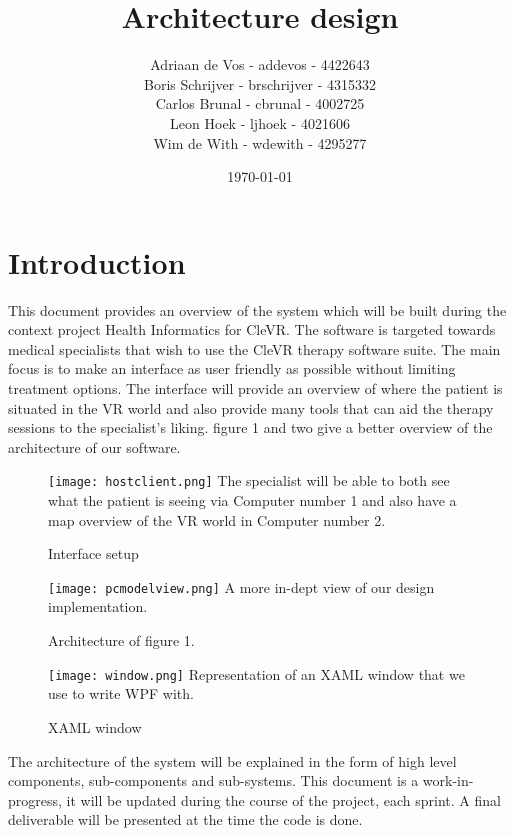 \documentclass[11pt]{article}
\begin{document}
\title{Architecture design}
\author{
	Adriaan de Vos - addevos - 4422643\\
	Boris Schrijver - brschrijver - 4315332\\
	Carlos Brunal - cbrunal - 4002725\\
	Leon Hoek - ljhoek - 4021606\\
	Wim de With - wdewith - 4295277
}

\date{\today}
\maketitle
\newpage
\tableofcontents
\newpage

\section{Introduction}
This document provides an overview of the system which will be built during the context project Health Informatics for \gls{CleVR}.
\newline
The software is targeted towards medical specialists that wish to use the CleVR therapy software suite. The main focus is to make an interface as user friendly as possible without limiting treatment options. The interface will provide an overview of where the patient is situated in the VR world and also provide many tools that can aid the therapy sessions to the specialist's liking. figure 1 and two give a better overview of the architecture of our software.

\begin{figure}[H]
	\caption{Interface setup}
	\texttt{[image: hostclient.png]}
    The specialist will be able to both see what the patient is seeing via Computer number 1 and also have a map overview of the VR world in Computer number 2.
\end{figure}

\begin{figure}[H]
	\caption{Architecture of figure 1.}
	\texttt{[image: pcmodelview.png]}
    A more in-dept view of our design implementation.
\end{figure}

\begin{figure}[H]
	\caption{XAML window}
	\texttt{[image: window.png]}
    Representation of an XAML window that we use to write WPF with.
\end{figure}

 The architecture of the system will be explained in the form of high level components, sub-components and sub-systems. This document is a work-in-progress, it will be updated during the course of the project, each sprint. A final deliverable will be presented at the time the code is done.
\end{document}
